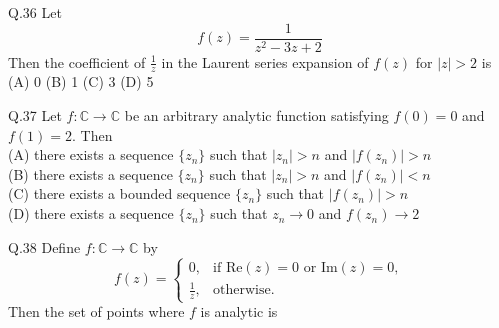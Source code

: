 \documentclass{article}
\begin{document}
																																			     \vspace{1em}

																																			     Q.36 Let
																																			     \[
																																			     f(z) = \frac{1}{z^2 - 3z + 2}
																																			     \]
																																			     Then the coefficient of $\frac{1}{z}$ in the Laurent series expansion of $f(z)$ for $|z| > 2$ is\\
																																			     \vspace{0.125cm} \newline
																																			     (A) 0 \hspace{2cm} (B) 1 \hspace{2cm} (C) 3 \hspace{2cm} (D) 5

																																			     \vspace{1em}

																																			     Q.37 Let $f: \mathbb{C} \rightarrow \mathbb{C}$ be an arbitrary analytic function satisfying $f(0) = 0$ and $f(1) = 2$. Then\\
																																			     \newline
																																			     (A) there exists a sequence $\{z_n\}$ such that $|z_n| > n$ and $|f(z_n)| > n$\\
																																			     (B) there exists a sequence $\{z_n\}$ such that $|z_n| > n$ and $|f(z_n)| < n$\\
																																			     (C) there exists a bounded sequence $\{z_n\}$ such that $|f(z_n)| > n$\\
																																			     (D) there exists a sequence $\{z_n\}$ such that $z_n \rightarrow 0$ and $f(z_n) \rightarrow 2$

																																			     \vspace{0.5cm}

																																			     Q.38 Define $f : \mathbb{C} \rightarrow \mathbb{C}$ by
																																			     \[
																																			     f(z) =
																																			     \begin{cases}
																																			     0, & \text{if } \text{Re}(z) = 0 \text{ or } \text{Im}(z) = 0,\\
																																			     \frac{1}{z}, & \text{otherwise}.
																																			     \end{cases}
																																			     \]
																																			     Then the set of points where $f$ is analytic is
																																			     \vspace{1em} \newline
\end{document}
